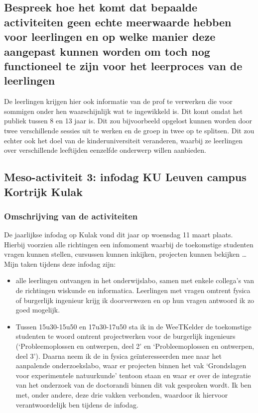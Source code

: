\documentclass[a4paper,12pt,twoside]{article}%
\begin{document}
	\subsection{Bespreek hoe het komt dat bepaalde activiteiten geen echte meerwaarde hebben voor leerlingen en op welke manier deze aangepast kunnen worden om toch nog functioneel te zijn voor het leerproces van de leerlingen}
	De leerlingen krijgen hier ook informatie van de prof te verwerken die voor sommigen onder hen waarschijnlijk wat te ingewikkeld is. Dit komt omdat het publiek tussen 8 en 13 jaar is. Dit zou bijvoorbeeld opgelost kunnen worden door twee verschillende sessies uit te werken en de groep in twee op te splitsen. Dit zou echter ook het doel van de kinderuniversiteit veranderen, waarbij ze leerlingen over verschillende leeftijden eenzelfde onderwerp willen aanbieden.
	
	
	
	\subsection{Meso-activiteit 3: infodag KU Leuven campus Kortrijk Kulak}
	\subsubsection{Omschrijving van de activiteiten}
	De jaarlijkse infodag op Kulak vond dit jaar op woensdag 11 maart plaats. Hierbij voorzien alle richtingen een infomoment waarbij de toekomstige studenten vragen kunnen stellen, cursussen kunnen inkijken, projecten kunnen bekijken \ldots Mijn taken tijdens deze infodag zijn:
	\begin{itemize}
		\item alle leerlingen ontvangen in het onderwijslabo, samen met enkele collega's van de richtingen wiskunde en informatica. Leerlingen met vragen omtrent fysica of burgerlijk ingenieur krijg ik doorverwezen en op hun vragen antwoord ik zo goed mogelijk.
		\item Tussen 15u30-15u50 en 17u30-17u50 sta ik in de WeeTKelder de toekomstige studenten te woord omtrent  projectwerken voor de burgerlijk ingenieurs (`Probleemoplossen en ontwerpen, deel 2' en `Probleemoplossen en ontwerpen, deel 3'). Daarna neem ik de in fysica geïnteresseerden mee naar het aanpalende onderzoekslabo, waar er projecten binnen het vak `Grondslagen voor experimentele natuurkunde' tentoon staan en waar er over de integratie van het onderzoek van de doctorandi binnen dit vak gesproken wordt. Ik ben met, onder andere, deze drie vakken verbonden, waardoor ik hiervoor verantwoordelijk ben tijdens de infodag.
	\end{itemize}
	
\end{document}
